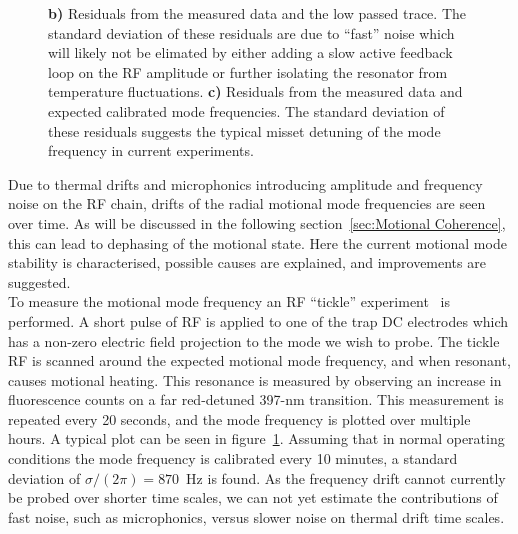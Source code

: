 \begin{figure}
{            \textbf{b)} Residuals from the measured data and the low passed trace. The standard deviation of these residuals are due to ``fast'' noise which will likely not be elimated by either adding a slow active feedback loop on the RF amplitude or further isolating the resonator from temperature fluctuations. 
            \textbf{c)} Residuals from the measured data and expected calibrated mode frequencies. The standard deviation of these residuals suggests the typical misset detuning of the mode frequency in current experiments.
            }
        \label{fig:mode drift}
    \end{figure}

    Due to thermal drifts and microphonics introducing amplitude and frequency noise on the RF chain, drifts of the radial motional mode frequencies are seen over time. As will be discussed in the following section~\ref{sec:Motional Coherence}, this can lead to dephasing of the motional state. Here the current motional mode stability is characterised, possible causes are explained, and improvements are suggested. \\
    To measure the motional mode frequency an RF ``tickle'' experiment~\cite{} is performed. A short pulse of RF is applied to one of the trap DC electrodes which has a non-zero electric field projection to the mode we wish to probe. The tickle RF is scanned around the expected motional mode frequency, and when resonant, causes motional heating. This resonance is measured by observing an increase in fluorescence counts on a far red-detuned 397-nm transition. This measurement is repeated every 20 seconds, and the mode frequency is plotted over multiple hours. A typical plot can be seen in figure~\ref{fig:mode drift}.  Assuming that in normal operating conditions the mode frequency is calibrated every 10 minutes, a standard deviation of $\sigma/(2\pi) = 870$~\unit{\Hz} is found. As the frequency drift cannot currently be probed over shorter time scales, we can not yet estimate the contributions of fast noise, such as microphonics, versus slower noise on thermal drift time scales. 
    
    

